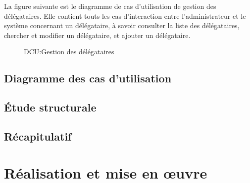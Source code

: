 \documentclass[a4paper]{report}
\begin{document}
\begin{doublespace}
	La figure suivante est le diagramme de cas d’utilisation de gestion des délégataires.
	Elle contient touts les cas d'interaction entre l'administrateur et le système concernant un délégataire,
	à savoir consulter la liste des délégataires, chercher et modifier un délégataire, et ajouter un délégataire.
	\begin{figure}[H]
		\begin{center}
			\caption{DCU:Gestion des délégataires}
		\end{center}
	\end{figure}

	\section{Diagramme des cas d'utilisation}

	\section{Étude structurale}
	\section{Récapitulatif}
	\chapter{Réalisation et mise en œuvre}
	\fancyhead[L]{\hspace*{5cm}}
\end{doublespace}

\newpage

\appendix
{} \setcounter{page}{1}
\end{document}
